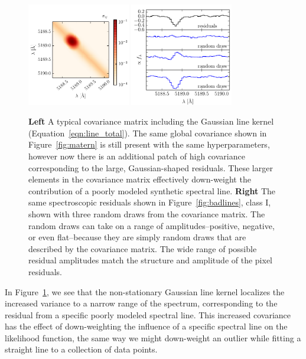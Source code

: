 \documentclass[preprint]{aastex} %
\begin{document}
\begin{figure}[!htb]
\begin{center}
\includegraphics[width=0.4\textwidth]{figs/gauss_matrix.pdf}
\includegraphics[width=0.4\textwidth]{figs/gauss_draw.pdf}
\caption{\textbf{Left} A typical covariance matrix including the Gaussian line kernel (Equation~\ref{eqn:line_total}). The same global covariance shown in Figure~\ref{fig:matern} is still present with the same hyperparameters, however now there is an additional patch of high covariance corresponding to the large, Gaussian-shaped residuals. These larger elements in the covariance matrix effectively down-weight the contribution of a poorly modeled synthetic spectral line.
\textbf{Right} The same spectroscopic residuals shown in Figure~\ref{fig:badlines}, class I, shown with three random draws from the covariance matrix. The random draws can take on a range of amplitudes--positive, negative, or even flat--because they are simply random draws that are described by the covariance matrix. The wide range of possible residual amplitudes match the structure and amplitude of the pixel residuals.}
\label{fig:region}
\end{center}
\end{figure}

In Figure~\ref{fig:region}, we see that the non-stationary Gaussian line kernel
localizes the increased variance to a narrow range of the spectrum,
corresponding to the residual from a specific poorly modeled spectral line.
This increased covariance has the effect of down-weighting the influence of a
specific spectral line on the likelihood function, the same way we might
down-weight an outlier while fitting a straight line to a collection of
data points. 
\end{document}
